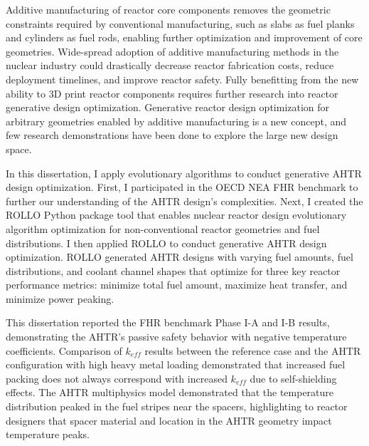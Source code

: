 
Additive manufacturing of reactor core components removes the geometric constraints
required by conventional manufacturing, such as slabs as fuel planks and cylinders 
as fuel rods, enabling further optimization and improvement of core geometries. 
Wide-spread adoption of additive manufacturing methods in the nuclear industry 
could drastically decrease reactor fabrication costs, reduce deployment timelines, 
and improve reactor safety. 
Fully benefitting from the new ability to 3D print reactor components requires further 
research into reactor generative design optimization. 
Generative reactor design optimization for arbitrary geometries enabled by additive 
manufacturing is a new concept, and few research demonstrations have been done to 
explore the large new design space. 

In this dissertation, I apply evolutionary algorithms to conduct generative \gls{AHTR} 
design optimization. 
First, I participated in the \gls{OECD} \gls{NEA} \gls{FHR} benchmark to further our 
understanding of the \gls{AHTR} design's complexities.  
Next, I created the \gls{ROLLO} Python package tool that enables nuclear reactor design 
evolutionary algorithm optimization for non-conventional reactor geometries and fuel 
distributions. 
I then applied \gls{ROLLO} to conduct generative \gls{AHTR} design optimization.
\gls{ROLLO} generated \gls{AHTR} designs with varying fuel amounts, fuel 
distributions, and coolant channel shapes that optimize for three key reactor 
performance metrics: minimize total fuel amount, maximize heat transfer, and 
minimize power peaking.

This dissertation reported the \gls{FHR} benchmark Phase I-A and I-B results, 
demonstrating the \gls{AHTR}'s passive safety behavior with 
negative temperature coefficients.
Comparison of $k_{eff}$ results between the reference case and the \gls{AHTR} 
configuration with high heavy metal loading demonstrated that increased fuel 
packing does not always correspond with increased $k_{eff}$ due to self-shielding 
effects.
The \gls{AHTR} multiphysics model demonstrated that the temperature distribution 
peaked in the fuel stripes near the spacers, highlighting to reactor designers that 
spacer material and location in the \gls{AHTR} geometry impact temperature peaks.  

